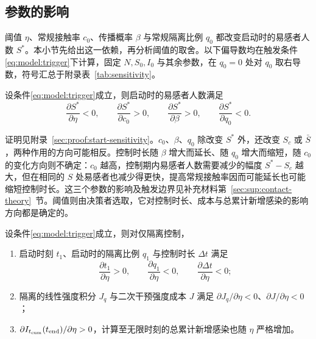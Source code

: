 \subsection{参数的影响}
\label{sec:scaling-theory}
阈值 $\eta$、常规接触率 $c_0$、传播概率 $\beta$ 与常规隔离比例 $q_0$ 都改变启动时的易感者人数 $S^*$。本小节先给出这一依赖，再分析阈值的取舍。以下偏导数均在触发条件\eqref{eq:model:trigger}下计算，固定 $N,S_0,I_0$ 与其余参数，在 $q_0=0$ 处对 $q_0$ 取右导数，符号汇总于附录表~\ref{tab:sensitivity}。
\begin{lemma}
\label{lem:s1:Sstar-sensitivity}
设条件\eqref{eq:model:trigger}成立，则启动时的易感者人数满足
\begin{equation}
\frac{\partial S^*}{\partial\eta}<0,\qquad
\frac{\partial S^*}{\partial c_0}>0,\qquad
\frac{\partial S^*}{\partial\beta}>0,\qquad
\frac{\partial S^*}{\partial q_0}<0.
\label{eq:s1:Sstar-signs}
\end{equation}
\end{lemma}
证明见附录~\ref{sec:proof:start-sensitivity}。$c_0$、$\beta$、$q_0$ 除改变 $S^*$ 外，还改变 $S_c$ 或 $\bar S$，两种作用的方向可能相反。控制时长随 $\beta$ 增大而延长、随 $q_0$ 增大而缩短，随 $c_0$ 的变化方向则不确定：$c_0$ 越高，控制期内易感者人数需要减少的幅度 $S^*-S_c$ 越大，但在相同的 $S$ 处易感者也减少得更快，提高常规接触率因而可能延长也可能缩短控制时长。这三个参数的影响及触发边界见补充材料第~\ref{sec:sup:contact-theory}~节。阈值则由决策者选取，它对控制时长、成本与总累计新增感染的影响方向都是确定的。
\begin{proposition}
\label{prop:threshold-tradeoff}\label{prop:s1:sensitivity}
设条件\eqref{eq:model:trigger}成立，则对仅隔离控制，
\begin{enumerate}
\renewcommand{\labelenumi}{(\roman{enumi})}
\item 启动时刻 $t_1$、启动时的隔离比例 $q_1$ 与控制时长 $\Delta t$ 满足
\begin{equation}
\frac{\partial t_1}{\partial\eta}>0,\qquad
\frac{\partial q_1}{\partial\eta}<0,\qquad
\frac{\partial\Delta t}{\partial\eta}<0;
\label{eq:threshold-tradeoff}
\end{equation}
\item 隔离的线性强度积分 $J_q$ 与二次干预强度成本 $J$ 满足 $\partial J_q/\partial\eta<0$、$\partial J/\partial\eta<0$；
\item $\partial I_{t_{\mathrm{cum}}}(t_{\rm end})/\partial\eta>0$，计算至无限时刻的总累计新增感染也随 $\eta$ 严格增加。
\end{enumerate}
\end{proposition}
